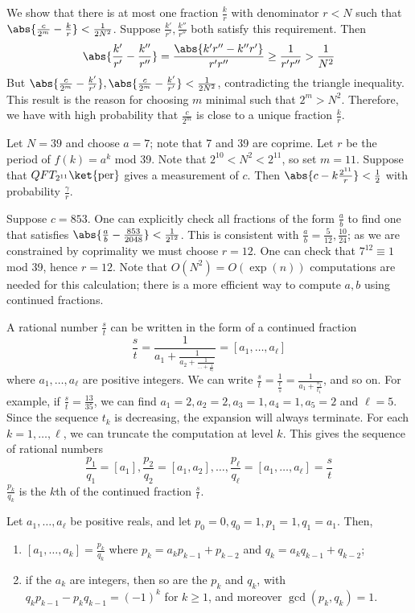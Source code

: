 We show that there is at most one fraction $\frac{k}{r}$ with denominator $r < N$ such that $\abs{\frac{c}{2^m} - \frac{k}{r}} < \frac{1}{2N^2}$.
Suppose $\frac{k'}{r'}, \frac{k''}{r''}$ both satisfy this requirement.
Then
\[ \abs{\frac{k'}{r'} - \frac{k''}{r''}} = \frac{\abs{k'r'' - k''r'}}{r'r''} \geq \frac{1}{r'r''} > \frac{1}{N^2} \]
But $\abs{\frac{c}{2^m} - \frac{k'}{r'}}, \abs{\frac{c}{2^m} - \frac{k'}{r'}} < \frac{1}{2N^2}$, contradicting the triangle inequality.
This result is the reason for choosing $m$ minimal such that $2^m > N^2$.
Therefore, we have with high probability that $\frac{c}{2^m}$ is close to a unique fraction $\frac{k}{r}$.
\begin{example}
    Let $N = 39$ and choose $a = 7$; note that 7 and 39 are coprime.
    Let $r$ be the period of $f(k) = a^k$ mod 39.
    Note that $2^{10} < N^2 < 2^{11}$, so set $m = 11$.
    Suppose that $QFT_{2^{11}} \ket{\mathrm{per}}$ gives a measurement of $c$.
    Then $\abs{c - k \frac{2^{11}}{r}} < \frac{1}{2}$ with probability $\frac{\gamma}{r}$.

    Suppose $c = 853$.
    One can explicitly check all fractions of the form $\frac{a}{b}$ to find one that satisfies $\abs{\frac{a}{b} - \frac{853}{2048}} < \frac{1}{2^{12}}$.
    This is consistent with $\frac{a}{b} = \frac{5}{12}, \frac{10}{24}$; as we are constrained by coprimality we must choose $r = 12$.
    One can check that $7^{12} \equiv 1$ mod 39, hence $r = 12$.
    Note that $O(N^2) = O(\exp(n))$ computations are needed for this calculation; there is a more efficient way to compute $a, b$ using continued fractions.
\end{example}
A rational number $\frac{s}{t}$ can be written in the form of a continued fraction
\[ \frac{s}{t} = \frac{1}{a_1 + \frac{1}{a_2 + \frac{1}{\dots + \frac{1}{a_\ell}}}} = [a_1, \dots, a_\ell] \]
where $a_1, \dots, a_\ell$ are positive integers.
We can write $\frac{s}{t} = \frac{1}{\frac{t}{s}} = \frac{1}{a_1 + \frac{s_1}{t_1}}$, and so on.
For example, if $\frac{s}{t} = \frac{13}{35}$, we can find $a_1 = 2, a_2 = 2, a_3 = 1, a_4 = 1, a_5 = 2$ and $\ell = 5$.
Since the sequence $t_k$ is decreasing, the expansion will always terminate.
For each $k = 1, \dots, \ell$, we can truncate the computation at level $k$.
This gives the sequence of rational numbers
\[ \frac{p_1}{q_1} = [a_1], \frac{p_2}{q_2} = [a_1, a_2], \dots, \frac{p_\ell}{q_\ell} = [a_1, \dots, a_\ell] = \frac{s}{t} \]
$\frac{p_k}{q_k}$ is the $k$th  of the continued fraction $\frac{s}{t}$.
\begin{lemma}
    Let $a_1, \dots, a_\ell$ be positive reals, and let $p_0 = 0, q_0 = 1, p_1 = 1, q_1 = a_1$.
    Then,
    \begin{enumerate}
        \item $[a_1, \dots, a_k] = \frac{p_k}{q_k}$ where $p_k = a_k p_{k-1} + p_{k-2}$ and $q_k = a_k q_{k-1} + q_{k-2}$;
        \item if the $a_k$ are integers, then so are the $p_k$ and $q_k$, with $q_k p_{k-1} - p_k q_{k-1} = (-1)^k$ for $k \geq 1$, and moreover $\gcd(p_k, q_k) = 1$.
    \end{enumerate}
\end{lemma}
